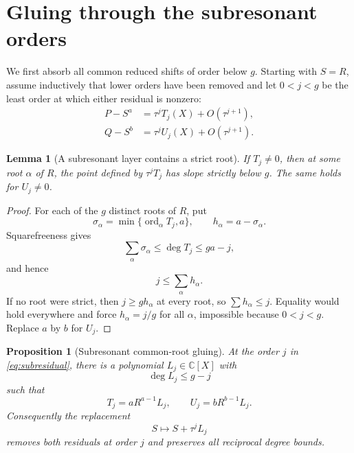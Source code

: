 \documentclass[11pt]{article}
\newtheorem{proposition}[theorem]{Proposition}
\newtheorem{lemma}[theorem]{Lemma}
\theoremstyle{definition}
\theoremstyle{remark}
\newcommand{\C}{\mathbb C}
\newcommand{\ord}{\operatorname{ord}}
\begin{document}
\section{Gluing through the subresonant orders}
\label{sec:subresonant}

We first absorb all common reduced shifts of order below \(g\).
Starting with \(S=R\), assume inductively that lower orders have been
removed and let \(0<j<g\) be the least order at which either residual
is nonzero:
\begin{equation}
\begin{aligned}
 P-S^a&=\tau^jT_j(X)+O(\tau^{j+1}),\\
 Q-S^b&=\tau^jU_j(X)+O(\tau^{j+1}).
\end{aligned}
\label{eq:subresidual}
\end{equation}

\begin{lemma}[A subresonant layer contains a strict root]
\label{lem:strict-root}
If \(T_j\neq0\), then at some root \(\alpha\) of \(R\), the point
defined by \(\tau^jT_j\) has slope strictly below \(g\).
The same holds for \(U_j\neq0\).
\end{lemma}

\begin{proof}
For each of the \(g\) distinct roots of \(R\), put
\[
 \sigma_\alpha
 =\min\{\ord_\alpha T_j,a\},\qquad
 h_\alpha=a-\sigma_\alpha.
\]
Squarefreeness gives
\[
 \sum_\alpha\sigma_\alpha\leq\deg T_j\leq ga-j,
\]
and hence
\begin{equation}
 j\leq\sum_\alpha h_\alpha.
\label{eq:degree-average}
\end{equation}
If no root were strict, then \(j\geq gh_\alpha\) at every root, so
\(\sum h_\alpha\leq j\).  Equality would hold everywhere and force
\(h_\alpha=j/g\) for all \(\alpha\), impossible because
\(0<j<g\).  Replace \(a\) by \(b\) for \(U_j\).
\end{proof}

\begin{proposition}[Subresonant common-root gluing]
\label{prop:subgluing}
At the order \(j\) in \eqref{eq:subresidual}, there is a polynomial
\(L_j\in\C[X]\) with
\[
 \deg L_j\leq g-j
\]
such that
\begin{equation}
 T_j=aR^{a-1}L_j,\qquad
 U_j=bR^{b-1}L_j.
\label{eq:glued-layer}
\end{equation}
Consequently the replacement
\[
 S\longmapsto S+\tau^jL_j
\]
removes both residuals at order \(j\) and preserves all reciprocal
degree bounds.
\end{proposition}
\end{document}
